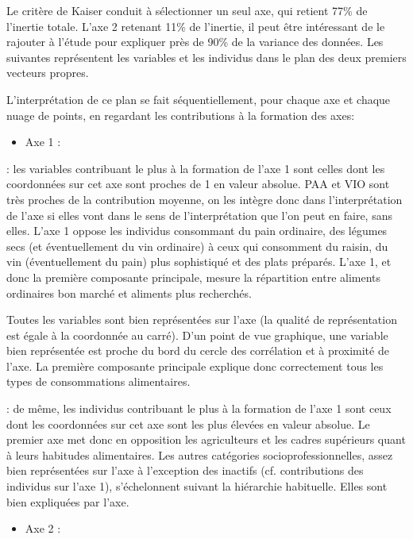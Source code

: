 \documentclass[letterpaper,10pt,french]{sphinxmanual}
\begin{document}
\sphinxAtStartPar
Le critère de Kaiser  conduit à sélectionner un seul axe, qui retient 77\% de l’inertie totale. L’axe 2 retenant 11\% de l’inertie, il peut être  intéressant de le rajouter à l’étude pour expliquer près de 90\% de la variance des données. Les suivantes représentent les variables et les individus dans le plan des deux premiers vecteurs propres.

\sphinxAtStartPar
{}

\sphinxAtStartPar
L’interprétation de ce plan se fait séquentiellement, pour chaque axe et chaque nuage de points, en regardant les contributions à la formation des axes:
\begin{itemize}
\item {} 
\sphinxAtStartPar
Axe 1 :

\end{itemize}

\sphinxhyphen{}  :  les variables contribuant le plus à la formation de l’axe 1 sont celles dont les coordonnées sur cet axe sont proches de 1 en valeur absolue.
PAA et VIO sont très proches de la contribution moyenne, on les intègre donc dans l’interprétation de l’axe si elles vont dans le sens de l’interprétation que l’on peut en faire, sans elles. L’axe 1 oppose les individus consommant du pain ordinaire, des légumes secs (et éventuellement du vin ordinaire) à ceux qui consomment du raisin, du vin (éventuellement du pain) plus sophistiqué et des plats préparés. L’axe 1, et donc la première composante principale, mesure la répartition entre aliments ordinaires bon marché et aliments plus recherchés.

\sphinxAtStartPar
Toutes les variables sont bien représentées sur l’axe (la qualité de représentation est égale à la coordonnée au carré). D’un point de vue graphique, une variable bien représentée est proche du bord du cercle des corrélation et à proximité de l’axe. La première composante principale explique donc correctement tous les types de consommations alimentaires.

\sphinxhyphen{}  : de même, les individus contribuant le plus à la formation de l’axe 1 sont ceux dont les coordonnées sur cet axe sont les plus élevées en valeur absolue. Le premier axe met donc en opposition les agriculteurs et les cadres supérieurs quant à leurs habitudes alimentaires. Les autres catégories socio\sphinxhyphen{}professionnelles, assez bien représentées sur l’axe à l’exception des inactifs (cf. contributions des individus sur l’axe 1), s’échelonnent suivant la hiérarchie habituelle. Elles sont bien expliquées par l’axe.
\begin{itemize}
\item {} 
\sphinxAtStartPar
Axe 2 :

\end{itemize}
\end{document}
